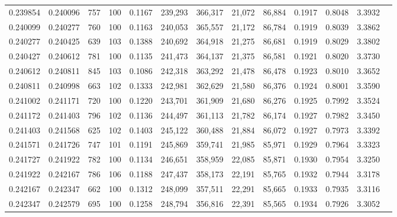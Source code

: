 \begin{tabular}{rrrrrrrrrrrrr}
0.239854 & 0.240096 &   757 & 100 &                                     0.1167 & 239,293 & 366,317 &  21,072 &  86,884 & 0.1917 & 0.8048 & 3.3932 \\
0.240099 & 0.240277 &   760 & 100 &                                     0.1163 & 240,053 & 365,557 &  21,172 &  86,784 & 0.1919 & 0.8039 & 3.3862 \\
0.240277 & 0.240425 &   639 & 103 &                                     0.1388 & 240,692 & 364,918 &  21,275 &  86,681 & 0.1919 & 0.8029 & 3.3802 \\
0.240427 & 0.240612 &   781 & 100 &                                     0.1135 & 241,473 & 364,137 &  21,375 &  86,581 & 0.1921 & 0.8020 & 3.3730 \\
0.240612 & 0.240811 &   845 & 103 &                                     0.1086 & 242,318 & 363,292 &  21,478 &  86,478 & 0.1923 & 0.8010 & 3.3652 \\
0.240811 & 0.240998 &   663 & 102 &                                     0.1333 & 242,981 & 362,629 &  21,580 &  86,376 & 0.1924 & 0.8001 & 3.3590 \\
0.241002 & 0.241171 &   720 & 100 &                                     0.1220 & 243,701 & 361,909 &  21,680 &  86,276 & 0.1925 & 0.7992 & 3.3524 \\
0.241172 & 0.241403 &   796 & 102 &                                     0.1136 & 244,497 & 361,113 &  21,782 &  86,174 & 0.1927 & 0.7982 & 3.3450 \\
0.241403 & 0.241568 &   625 & 102 &                                     0.1403 & 245,122 & 360,488 &  21,884 &  86,072 & 0.1927 & 0.7973 & 3.3392 \\
0.241571 & 0.241726 &   747 & 101 &                                     0.1191 & 245,869 & 359,741 &  21,985 &  85,971 & 0.1929 & 0.7964 & 3.3323 \\
0.241727 & 0.241922 &   782 & 100 &                                     0.1134 & 246,651 & 358,959 &  22,085 &  85,871 & 0.1930 & 0.7954 & 3.3250 \\
0.241922 & 0.242167 &   786 & 106 &                                     0.1188 & 247,437 & 358,173 &  22,191 &  85,765 & 0.1932 & 0.7944 & 3.3178 \\
0.242167 & 0.242347 &   662 & 100 &                                     0.1312 & 248,099 & 357,511 &  22,291 &  85,665 & 0.1933 & 0.7935 & 3.3116 \\
0.242347 & 0.242579 &   695 & 100 &                                     0.1258 & 248,794 & 356,816 &  22,391 &  85,565 & 0.1934 & 0.7926 & 3.3052 \\

\end{tabular}
